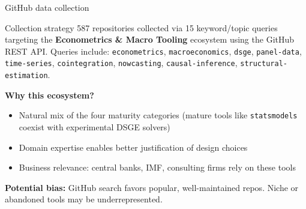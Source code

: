 \begin{frame}{GitHub data collection}

  \begin{bluebox}{Collection strategy}
    587 repositories collected via 15 keyword/topic queries targeting the
    \textbf{Econometrics \& Macro Tooling} ecosystem using the GitHub REST API.
    Queries include: \texttt{econometrics}, \texttt{macroeconomics}, \texttt{dsge},
    \texttt{panel-data}, \texttt{time-series}, \texttt{cointegration}, \texttt{nowcasting},
    \texttt{causal-inference}, \texttt{structural-estimation}.
  \end{bluebox}

  \bigskip
  \textbf{Why this ecosystem?}
  \begin{itemize}
    \item Natural mix of the four maturity categories (mature tools like
          \texttt{statsmodels} coexist with experimental DSGE solvers)
    \item Domain expertise enables better justification of design choices
    \item Business relevance: central banks, IMF, consulting firms rely on these tools
  \end{itemize}

  \bigskip
  \small \textbf{Potential bias:} GitHub search favors popular, well-maintained repos.
  Niche or abandoned tools may be underrepresented.

\end{frame}


